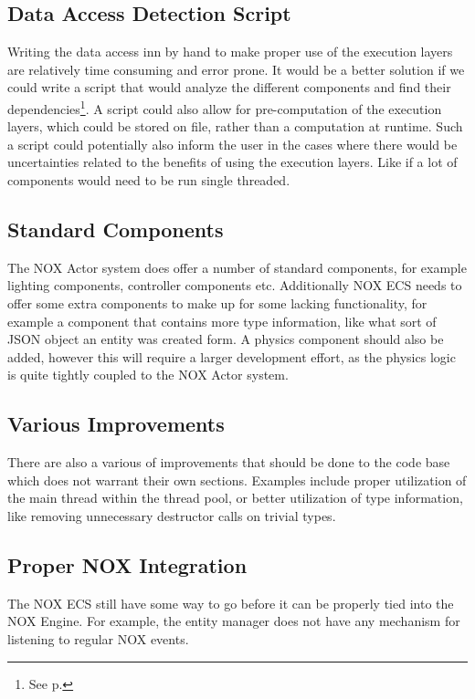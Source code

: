 \subsection{Data Access Detection Script}
Writing the data access inn by hand to make proper use of the execution layers are relatively time consuming
and error prone.
It would be a better solution if we could write a script that would analyze the different
components and find their dependencies\footnote{See p.\pageref{par:detailed_execution_layers_code_analysis}}.
A script could also allow for pre-computation of the execution layers, which could be stored on file,
rather than a computation at runtime.
Such a script could potentially also inform the user in the cases where there would be uncertainties related
to the benefits of using the execution layers.
Like if a lot of components would need to be run single threaded.

\subsection{Standard Components}
The NOX Actor system does offer a number of standard components, for example lighting components,
controller components etc.
Additionally NOX ECS needs to offer some extra components to make up for some lacking functionality,
for example a component that contains more type information, like what sort of JSON object an entity was created form.
A physics component should also be added, however this will require a larger development effort, as the physics logic
is quite tightly coupled to the NOX Actor system.

\subsection{Various Improvements}
There are also a various of improvements that should be done to the code base which does not warrant
their own sections. Examples include proper utilization of the main thread within the thread pool,
or better utilization of type information, like removing unnecessary destructor calls on trivial types.

\subsection{Proper NOX Integration}
The NOX ECS still have some way to go before it can be properly tied into the NOX Engine.
For example, the entity manager does not have any mechanism for listening to regular NOX events.

